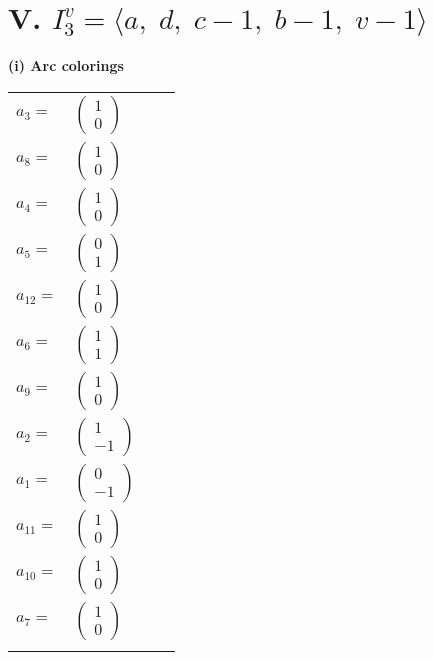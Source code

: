 \documentclass[1p]{elsarticle_modified}
\theoremstyle{definition}
\begin{document}
\centering \section*{V. $I^v_{3}= \langle a,\;d,\;c-1,\;b-1,\;v-1 \rangle$}
\flushleft \textbf{(i) Arc colorings}\\
\begin{tabular}{m{7pt} m{180pt} m{7pt} m{180pt} }
\flushright $a_{3}=$&$\begin{pmatrix}1\\0\end{pmatrix}$ \\
\flushright $a_{8}=$&$\begin{pmatrix}1\\0\end{pmatrix}$ \\
\flushright $a_{4}=$&$\begin{pmatrix}1\\0\end{pmatrix}$ \\
\flushright $a_{5}=$&$\begin{pmatrix}0\\1\end{pmatrix}$ \\
\flushright $a_{12}=$&$\begin{pmatrix}1\\0\end{pmatrix}$ \\
\flushright $a_{6}=$&$\begin{pmatrix}1\\1\end{pmatrix}$ \\
\flushright $a_{9}=$&$\begin{pmatrix}1\\0\end{pmatrix}$ \\
\flushright $a_{2}=$&$\begin{pmatrix}1\\-1\end{pmatrix}$ \\
\flushright $a_{1}=$&$\begin{pmatrix}0\\-1\end{pmatrix}$ \\
\flushright $a_{11}=$&$\begin{pmatrix}1\\0\end{pmatrix}$ \\
\flushright $a_{10}=$&$\begin{pmatrix}1\\0\end{pmatrix}$ \\
\flushright $a_{7}=$&$\begin{pmatrix}1\\0\end{pmatrix}$\\&\end{tabular}
\end{document}
